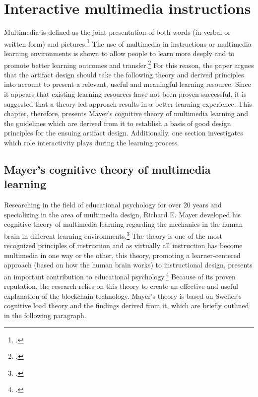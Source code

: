 \chapter{Interactive multimedia instructions} \label{chapter:Multimedia}

Multimedia is defined as the joint presentation of both words (in verbal or written form) and pictures.\footcites[Cf.][p.2]{MayerMultimediaLearning2009}[cf.][p.1205]{MarraffinoApplyingMultimediaLearning2016}[cf.][p.13]{MayerAnimationAidMultimedia2001} The use of multimedia in instructions or multimedia learning environments is shown to allow people to learn more deeply and to promote better learning outcomes and transfer.\footcites[Cf.][p.3]{MayerMultimediaLearning2009}[cf. in addition][]{MunzerLearningmultimediapresentations2009} For this reason, the paper argues that the artifact design should take the following theory and derived principles into account to present a relevant, useful and meaningful learning resource. Since it appears that existing learning resources have not been proven successful, it is suggested that a theory-led approach results in a better learning experience. This chapter, therefore, presents Mayer's cognitive theory of multimedia learning and the guidelines which are derived from it to establish a basis of good design principles for the ensuing artifact design. Additionally, one section investigates which role interactivity plays during the learning process. 

\section{Mayer's cognitive theory of multimedia learning} \label{sec:MayersCTML}
Researching in the field of educational psychology for over 20 years and specializing in the area of multimedia design, Richard E. Mayer developed his cognitive theory of multimedia learning regarding the mechanics in the human brain in different learning environments.\footcites[Cf.][]{MayerMultimediaLearning2009}
The theory is one of the most recognized principles of instruction and as virtually all instruction has become multimedia in one way or the other, this theory, promoting a learner-centered approach (based on how the human brain works) to instructional design, presents an important contribution to educational psychology.\footcites[Cf.][chapter 1, paragraph 3]{ClarkElearningscienceinstruction2016}[cf.][p.4 et seqq]{MayerMultimediaLearning2009}[cf. in addition][]{SordenCognitiveTheoryMultimedia2012} Because of its proven reputation, the research relies on this theory to create an effective and useful explanation of the blockchain technology.
Mayer's theory is based on Sweller's cognitive load theory and the findings derived from it, which are briefly outlined in the following paragraph.


